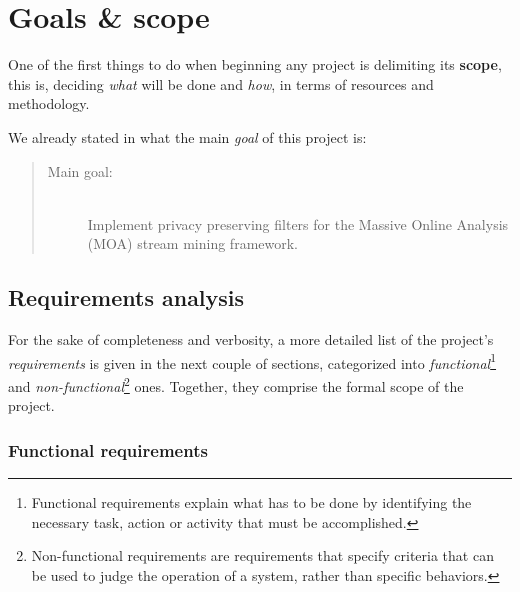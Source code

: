 \section{Goals \& scope}
\label{Management:Scope}

One of the first things to do when beginning any project is delimiting its \textbf{scope}, this is, deciding \textit{what} will be done and \textit{how}, in terms of resources and methodology.

We already stated in  what the main \textit{goal} of this project is:

\begin{quote}
	\begin{description}
		\item[Main goal:] \hfill \\
		Implement privacy preserving filters for the Massive Online Analysis (MOA) stream mining framework.
	\end{description}
\end{quote}

\subsection{Requirements analysis}
\label{Management:Scope:Requirements}

For the sake of completeness and verbosity, a more detailed list of the project's \textit{requirements} is given in the next couple of sections, categorized into \textit{functional}\footnote{Functional requirements explain what has to be done by identifying the necessary task, action or activity that must be accomplished.} and \textit{non-functional}\footnote{Non-functional requirements are requirements that specify criteria that can be used to judge the operation of a system, rather than specific behaviors.} ones. Together, they comprise the formal scope of the project.

\subsubsection*{Functional requirements}

